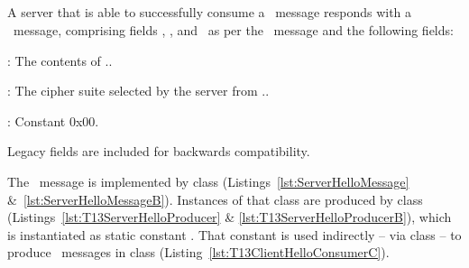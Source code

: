 \subsection{\ServerHello}\label{sec:handshakeSH}\label{sec:SH}

A server that is able to successfully consume a \ClientHello\ message responds
with a \ServerHello\ message, %
comprising fields \TLSlegacyVersion, \TLSrandom, and \TLSextensions\ as per the 
\ClientHello\ message and the following fields:

\begin{description}

\item \TLSlegacySessionIdEcho: The contents of \ClientHello.\TLSlegacySessionId.

\item \TLScipherSuite:  The cipher suite selected by the server from \ClientHello.\TLScipherSuites.

\item \TLSlegacyCompressionMode: Constant 0x00.

\end{description}

\noindent
Legacy fields are included for backwards compatibility.

\begin{tcolorbox}
The \ServerHello\ message is implemented by class 
(Listings~\ref{lst:ServerHelloMessage} \&~\ref{lst:ServerHelloMessageB}). Instances 
of that class are produced by class 
(Listings~\ref{lst:T13ServerHelloProducer} \& \ref{lst:T13ServerHelloProducerB}), %
which is instantiated as static constant . That 
constant is used indirectly -- via class  -- to produce
\ServerHello\ messages in class 
(Listing~\ref{lst:T13ClientHelloConsumerC}).
\end{tcolorbox}

\begin{comment}
\footnotetext{Class \code{ServerHello.T13ServerHelloProducer} implements
  interface \code{HandshakeProducer}, which defines a single method, namely, 
  \code{byte[] produce(ConnectionContext context, HandshakeMessage message) throws IOException}, 
  where parameter \code{context} defines the active context in both interfaces 
  and may be cast to children \code{ClientHandshakeContext} and \code{ServerHandshakeContext}.
  That context may be updated during production of messages or production may conclude
  by returning \textcolor{red}{``the encoded producing'' (reword)}.
  \textcolor{red}{Are these details worth knowing?}
}
\end{comment}


